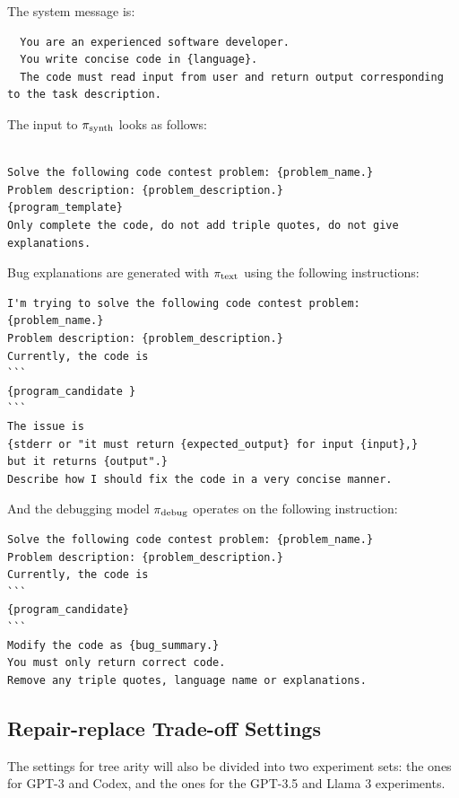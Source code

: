 \newpage
The system message is: 
\begin{lstlisting}
  You are an experienced software developer.
  You write concise code in {language}.
  The code must read input from user and return output corresponding to the task description.
\end{lstlisting}

The input to $ \pi_\text{synth} $ looks as follows: 
\begin{lstlisting}

Solve the following code contest problem: {problem_name.}
Problem description: {problem_description.}
{program_template}
Only complete the code, do not add triple quotes, do not give explanations.
\end{lstlisting}

Bug explanations are generated with $ \pi_\text{text} $ using the following instructions:
\begin{lstlisting}
I'm trying to solve the following code contest problem: {problem_name.}
Problem description: {problem_description.}
Currently, the code is
```
{program_candidate }
```
The issue is 
{stderr or "it must return {expected_output} for input {input},} 
but it returns {output".}
Describe how I should fix the code in a very concise manner. 
\end{lstlisting}

And the debugging model $ \pi_\text{debug} $ operates on the following instruction:
\begin{lstlisting}
Solve the following code contest problem: {problem_name.} 
Problem description: {problem_description.} 
Currently, the code is  
```
{program_candidate} 
```
Modify the code as {bug_summary.} 
You must only return correct code.  
Remove any triple quotes, language name or explanations.
\end{lstlisting}



\newpage\subsection{Repair-replace Trade-off Settings}
\label{sec:seidr-trade-off-settings}

The settings for tree arity will also be divided into two experiment sets: the ones for GPT-3 and Codex, and the ones for the GPT-3.5 and Llama 3 experiments.

